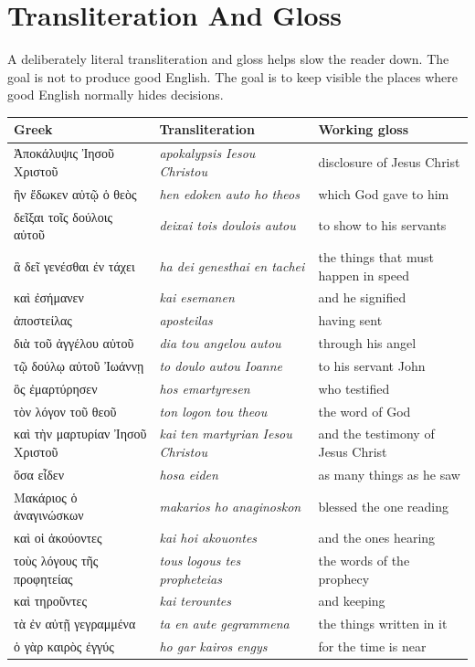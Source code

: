\section{Transliteration And Gloss}

A deliberately literal transliteration and gloss helps slow the reader down. The goal is not to produce good English. The goal is to keep visible the places where good English normally hides decisions.

\begin{center}
\begin{longtable}{L{0.29\textwidth}L{0.32\textwidth}L{0.29\textwidth}}
\toprule
Greek & Transliteration & Working gloss \\
\midrule
\textgreek{Ἀποκάλυψις Ἰησοῦ Χριστοῦ} & \textit{apokalypsis Iesou Christou} & disclosure of Jesus Christ \\
\textgreek{ἣν ἔδωκεν αὐτῷ ὁ θεὸς} & \textit{hen edoken auto ho theos} & which God gave to him \\
\textgreek{δεῖξαι τοῖς δούλοις αὐτοῦ} & \textit{deixai tois doulois autou} & to show to his servants \\
\textgreek{ἃ δεῖ γενέσθαι ἐν τάχει} & \textit{ha dei genesthai en tachei} & the things that must happen in speed \\
\textgreek{καὶ ἐσήμανεν} & \textit{kai esemanen} & and he signified \\
\textgreek{ἀποστείλας} & \textit{aposteilas} & having sent \\
\textgreek{διὰ τοῦ ἀγγέλου αὐτοῦ} & \textit{dia tou angelou autou} & through his angel \\
\textgreek{τῷ δούλῳ αὐτοῦ Ἰωάννῃ} & \textit{to doulo autou Ioanne} & to his servant John \\
\textgreek{ὃς ἐμαρτύρησεν} & \textit{hos emartyresen} & who testified \\
\textgreek{τὸν λόγον τοῦ θεοῦ} & \textit{ton logon tou theou} & the word of God \\
\textgreek{καὶ τὴν μαρτυρίαν Ἰησοῦ Χριστοῦ} & \textit{kai ten martyrian Iesou Christou} & and the testimony of Jesus Christ \\
\textgreek{ὅσα εἶδεν} & \textit{hosa eiden} & as many things as he saw \\
\textgreek{Μακάριος ὁ ἀναγινώσκων} & \textit{makarios ho anaginoskon} & blessed the one reading \\
\textgreek{καὶ οἱ ἀκούοντες} & \textit{kai hoi akouontes} & and the ones hearing \\
\textgreek{τοὺς λόγους τῆς προφητείας} & \textit{tous logous tes propheteias} & the words of the prophecy \\
\textgreek{καὶ τηροῦντες} & \textit{kai terountes} & and keeping \\
\textgreek{τὰ ἐν αὐτῇ γεγραμμένα} & \textit{ta en aute gegrammena} & the things written in it \\
\textgreek{ὁ γὰρ καιρὸς ἐγγύς} & \textit{ho gar kairos engys} & for the time is near \\
\bottomrule
\end{longtable}
\end{center}

